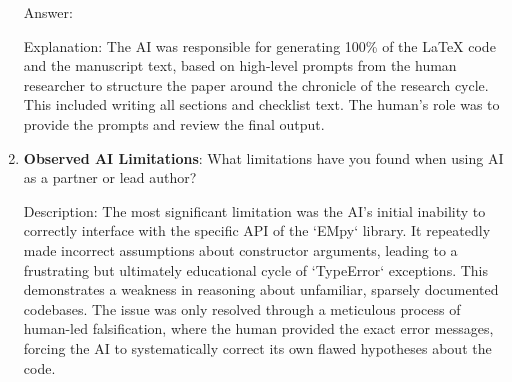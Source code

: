 \documentclass{article}
\begin{document}
\begin{enumerate}
    Answer: \involvementD{}

    Explanation: The AI was responsible for generating 100\% of the LaTeX code and the manuscript text, based on high-level prompts from the human researcher to structure the paper around the chronicle of the research cycle. This included writing all sections and checklist text. The human's role was to provide the prompts and review the final output.

    \item \textbf{Observed AI Limitations}: What limitations have you found when using AI as a partner or lead author?

    Description: The most significant limitation was the AI's initial inability to correctly interface with the specific API of the `EMpy` library. It repeatedly made incorrect assumptions about constructor arguments, leading to a frustrating but ultimately educational cycle of `TypeError` exceptions. This demonstrates a weakness in reasoning about unfamiliar, sparsely documented codebases. The issue was only resolved through a meticulous process of human-led falsification, where the human provided the exact error messages, forcing the AI to systematically correct its own flawed hypotheses about the code.
\end{enumerate}

\newpage
\end{document}
